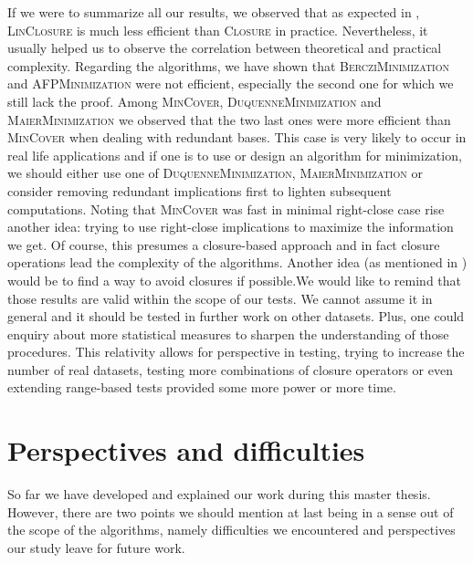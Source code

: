  If we were to summarize all our results, we observed that as expected
in \cite{bazhanov_optimizations_2014}, \textsc{LinClosure} is much less efficient than \textsc{Closure} in practice. Nevertheless, it usually helped
us to observe the correlation between theoretical and practical complexity.
Regarding the algorithms, we have shown that \textsc{BercziMinimization} and
\textsc{AFPMinimization} were not efficient, especially the second one for
which we still lack the proof. Among \textsc{MinCover}, \textsc{DuquenneMinimization} and \textsc{MaierMinimization} we observed that
the two last ones were more efficient than \textsc{MinCover} when dealing
with redundant bases. This case is very likely to occur in real life applications and if one is to use or design an algorithm for minimization, we should either use one of \textsc{DuquenneMinimization}, \textsc{MaierMinimization} or consider removing redundant implications first to lighten subsequent computations. Noting that \textsc{MinCover} was fast in minimal right-close case rise another idea: trying to use right-close implications to maximize the information we get. Of course, this presumes a closure-based approach and in fact closure operations lead the complexity of the algorithms. Another idea (as mentioned in \cite{duquenne_variations_2007}) would be to find a way to avoid closures if possible.We would like to remind that those results are valid within the scope of our tests. We cannot assume it in general and it should be tested in further work on other datasets. Plus, one could enquiry about more statistical measures to sharpen the understanding of those procedures. This relativity allows for perspective in testing, trying to
increase the number of real datasets, testing more combinations of closure
operators or even extending range-based tests provided some more power or
more time.

\section{Perspectives and difficulties}

So far we have developed and explained our work during this master thesis. However, there are two points we should mention at last being in a sense out of 
the scope of the algorithms, namely difficulties we encountered and perspectives
our study leave for future work. 

\vspace{1.2em}

